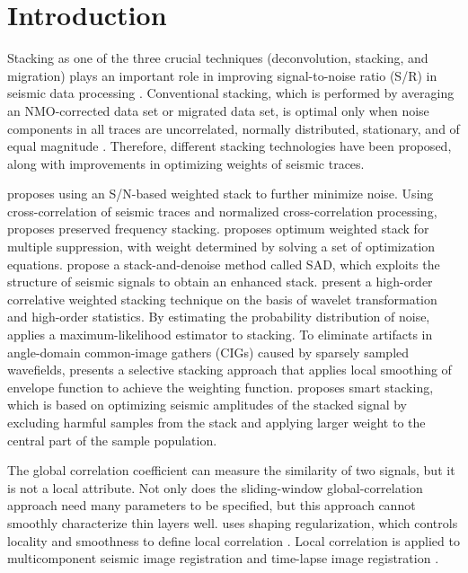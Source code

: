\section{Introduction}

Stacking as one of the three crucial techniques (deconvolution,
stacking, and migration) plays an important role in improving 
signal-to-noise ratio (S/R) in seismic data processing \cite[]{Yilmaz01}.
Conventional stacking, which is performed by averaging an NMO-corrected
data set or migrated data set, is optimal only when noise
components in all traces are uncorrelated, normally distributed, stationary,
and of equal magnitude \cite[]{Mayne62,Neelamani06}. Therefore, different 
stacking technologies have been proposed,
along with improvements in optimizing weights of seismic
traces.

\cite{Robinson70} proposes using an S/N-based weighted stack to
further minimize noise. Using cross-correlation of seismic traces and
normalized cross-correlation processing, \cite{Chang96} proposes
preserved frequency stacking. \cite{Schoenberger96} proposes optimum
weighted stack for multiple suppression, with weight determined
by solving a set of optimization equations. \cite{Neelamani06} 
propose a stack-and-denoise method called SAD, which exploits
the structure of seismic signals to obtain an enhanced stack.
\cite{Zhang06} present a high-order correlative weighted
stacking technique on the basis of wavelet transformation and high-order
statistics. By estimating the probability distribution of noise,
\cite{Trickett07} applies a maximum-likelihood estimator to stacking.
To eliminate artifacts in angle-domain common-image gathers
(CIGs) caused by sparsely sampled wavefields, \cite{Tang07} presents
a selective stacking approach that applies local smoothing of
envelope function to achieve the weighting function. \cite{Rashed08}
proposes smart stacking, which is based on optimizing seismic amplitudes
of the stacked signal by excluding harmful samples from the
stack and applying larger weight to the central part of the sample
population.

The global correlation coefficient can measure the similarity of
two signals, but it is not a local attribute. Not only does the sliding-window
global-correlation approach need many parameters to be
specified, but this approach cannot smoothly characterize thin layers
well. \cite{Fomel07a} uses shaping regularization, which controls locality
and smoothness to define local correlation \cite[]{Fomel07b}.
Local correlation is applied to multicomponent seismic image registration
\cite[]{Fomel05,Fomel07b} and time-lapse image registration
\cite[]{Fomel07}.

